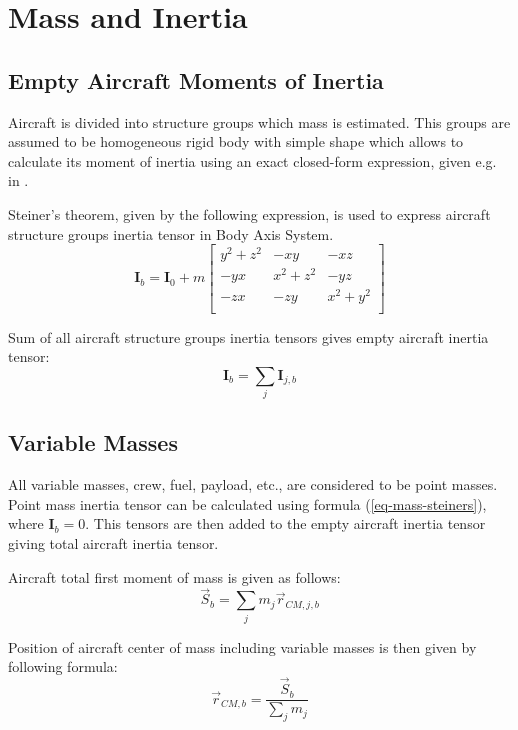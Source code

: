 \chapter{Mass and Inertia}

\section{Empty Aircraft Moments of Inertia}

Aircraft is divided into structure groups which mass is estimated. This groups are assumed to be homogeneous rigid body with simple shape which allows to calculate its moment of inertia using an exact closed-form expression, given e.g. in \cite{HousnerHudson1980}.

Steiner’s theorem, given by the following expression, is used to express aircraft structure groups inertia tensor in Body Axis System. \cite{Taylor2005, ResnickHalliday2011}
\begin{equation}
  \label{eq-mass-steiners}
  {\boldsymbol I}_b
  =
  {\boldsymbol I}_0
  +
  m
  \left[
    \begin{matrix}
      y^2 + z^2 &       -xy &       -xz \\
            -yx & x^2 + z^2 &       -yz \\
            -zx &       -zy & x^2 + y^2 \\
    \end{matrix}
  \right]
\end{equation}

Sum of all aircraft structure groups inertia tensors gives empty aircraft inertia tensor:
\begin{equation}
  {\boldsymbol I}_b = \sum_{j} {\boldsymbol I}_{j,b}
\end{equation}

\section{Variable Masses}

All variable masses, crew, fuel, payload, etc., are considered to be point masses. Point mass inertia tensor can be calculated using formula (\ref{eq-mass-steiners}), where ${\boldsymbol I}_b = 0$. This tensors are then added to the empty aircraft inertia tensor giving total aircraft inertia tensor.

Aircraft total first moment of mass is given as follows:
\begin{equation}
  {\vec S}_b = \sum_{j} m_j {\vec r}_{CM,j,b}
\end{equation}

Position of aircraft center of mass including variable masses is then given by following formula:
\begin{equation}
  {\vec r}_{CM,b} = \frac{ {\vec S}_b }{ \sum_{j} m_j }
\end{equation}
